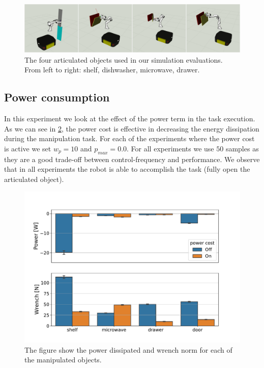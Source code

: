 \begin{figure}[t]
\centering
  \includegraphics[width=\columnwidth]{framework_manipulation/figures/mosaics/articulated_objects_sim.pdf}
  \caption{The four articulated objects used in our simulation evaluations. From left to right: shelf, dishwasher, microwave, drawer.} \label{fig:object_manipulation}
\end{figure}

\subsection{Power consumption}
In this experiment we look at the effect of the power term in the task execution. As we can see in \fig \ref{fig:power_cost_comparison}, the power cost is effective in decreasing the energy dissipation during the manipulation task. For each of the experiments where the power cost is active we set $w_p=10$ and $p_{max} = 0.0$. For all experiments we use $50$ samples as they are a good trade-off between control-frequency and performance. We observe that in all experiments the robot is able to accomplish the task (fully open the articulated object). 

\begin{figure}[t]
\centering
  \includegraphics[width=0.8\columnwidth]{figures/methods_comparison/power_cost.pdf}
  \caption{The figure show the power dissipated and wrench norm for each of the manipulated objects.} \label{fig:power_cost_comparison}
\end{figure}


